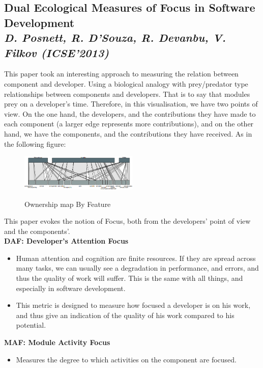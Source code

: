 \subsection{Dual Ecological Measures of Focus in Software Development\\ \textit{D. Posnett, R. D’Souza, R. Devanbu, V. Filkov (ICSE'2013)}}

This paper took an interesting approach to measuring the relation between component and developer. Using a biological analogy with prey/predator type relationships between components and developers\cite{Posnett}. That is to say that modules prey on a developer's time. Therefore, in this visualisation, we have two points of view. On the one hand, the developers, and the contributions they have made to each component (a larger edge represents more contributions), and on the other hand, we have the components, and the contributions they have received. As in the following figure:

\begin{figure}[H]
\centering
\includegraphics[width=0.5\textwidth]{./resources/focus.png}~
\caption{Ownership map By Feature}
\label{fig:focus}
\end{figure}

This paper evokes the notion of Focus, both from the developers' point of view and the components'.
\\[0.4cm]
\textbf{DAF: Developer’s Attention Focus}
\begin{itemize}
\item Human attention and cognition are finite resources. If they are spread across many tasks, we can usually see a degradation in performance, and errors, and thus the quality of work will suffer. This is the same with all things, and especially in software development.
\item This metric is designed to measure how focused a developer is on his work, and thus give an indication of the quality of his work compared to his potential.
\end{itemize}

\textbf{MAF: Module Activity Focus}
\begin{itemize}
\item Measures the degree to which activities on the component are focused.
\end{itemize}

